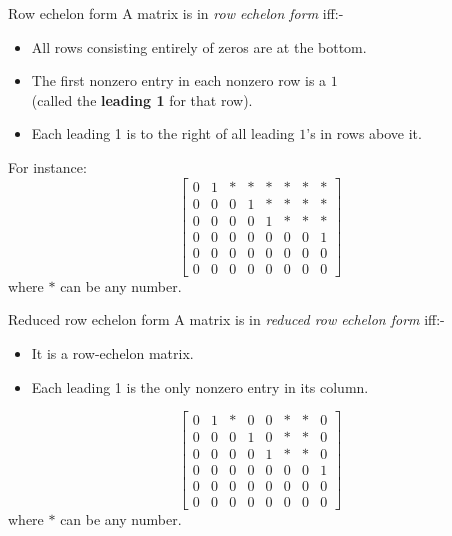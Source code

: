 \documentclass{beamer}
\begin{document}
\begin{frame}{Row echelon form}
  A matrix is in \emph{row echelon form} iff:-
  \begin{itemize}
  \item All rows consisting entirely of zeros are at the 
    bottom.
  \item The first nonzero entry in each nonzero row is a $1$
    \\(called the {\bf leading 1} for that row).
  \item Each leading 1 is to the right of all leading $1$'s 
    in rows above it.
  \end{itemize}
  For instance:
  \begin{equation*}
    \left[\begin{array}{rrrrrrrr}
            0 & 1 & * & * & * & * & * & * \\
            0 & 0 & 0 & 1 & * & * & * & * \\
            0 & 0 & 0 & 0 & 1 & * & * & * \\
            0 & 0 & 0 & 0 & 0 & 0 & 0 & 1 \\
            0 & 0 & 0 & 0 & 0 & 0 & 0 & 0 \\
            0 & 0 & 0 & 0 & 0 & 0 & 0 & 0 
          \end{array}\right]
      \end{equation*}
      where $*$ can be any number.
\end{frame}

\begin{frame}{Reduced row echelon form}
  A matrix is in \emph{reduced row echelon form} iff:-
  \begin{itemize}
  \item It is a row-echelon matrix.
  \item Each leading 1 is the only nonzero entry in its
    column.
  \end{itemize}
  \begin{equation*}
      \left[\begin{array}{rrrrrrrr}
              0 & 1 & * & 0 & 0 & * & * & 0 \\
              0 & 0 & 0 & 1 & 0 & * & * & 0 \\
              0 & 0 & 0 & 0 & 1 & * & * & 0 \\
              0 & 0 & 0 & 0 & 0 & 0 & 0 & 1 \\
              0 & 0 & 0 & 0 & 0 & 0 & 0 & 0 \\
              0 & 0 & 0 & 0 & 0 & 0 & 0 & 0 
            \end{array}\right] 
        \end{equation*}
        where $*$ can be any number.
\end{frame}
\end{document}
